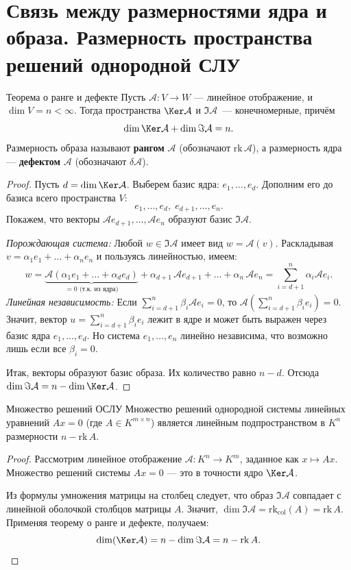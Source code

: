 
\section{Связь между размерностями ядра и образа. Размерность пространства решений однородной СЛУ}

\begin{Proposition}{Теорема о ранге и дефекте}{}
	Пусть $\mathcal{A} \colon V \to W$ --- линейное отображение, и $\dim V = n < \infty$.
	Тогда пространства $\Ker\mathcal{A}$ и $\Im\mathcal{A}$~--- конечномерные, причём
	\[
	\dim\Ker\mathcal{A} + \dim\Im\mathcal{A} = n.
	\]
	Размерность образа называют \textbf{рангом} $\mathcal{A}$ (обозначают $\mathrm{rk}\,\mathcal{A}$), а размерность ядра --- \textbf{дефектом} $\mathcal{A}$ (обозначают $\delta\mathcal{A}$).
\end{Proposition}

\begin{proof}
	Пусть $d = \dim\Ker\mathcal{A}$. Выберем базис ядра: $e_1, \ldots, e_d$.
	Дополним его до базиса всего пространства $V$:
	\[
	e_1, \ldots, e_d,\; e_{d+1}, \ldots, e_n.
	\]
	Покажем, что векторы $\mathcal{A}e_{d+1}, \ldots, \mathcal{A}e_n$ образуют базис $\Im\mathcal{A}$.
	
	\textit{Порождающая система:} Любой $w \in \Im\mathcal{A}$ имеет вид $w = \mathcal{A}(v)$. Раскладывая $v = \alpha_1e_1 + \dots + \alpha_ne_n$ и пользуясь линейностью, имеем:
	\[
	w = \underbrace{\mathcal{A}(\alpha_1 e_1 + \ldots + \alpha_d e_d)}_{=0 \text{ (т.к. из ядра)}} + \alpha_{d+1}\,\mathcal{A}e_{d+1} + \ldots + \alpha_n\,\mathcal{A}e_n = \sum_{i=d+1}^n \alpha_i \mathcal{A}e_i.
	\]
	\textit{Линейная независимость:} Если $\sum_{i=d+1}^n \beta_i \mathcal{A}e_i = 0$, то $\mathcal{A}\left(\sum_{i=d+1}^n \beta_i e_i\right) = 0$. Значит, вектор $u = \sum_{i=d+1}^n \beta_i e_i$ лежит в ядре и может быть выражен через базис ядра $e_1, \dots, e_d$. Но система $e_1, \dots, e_n$ линейно независима, что возможно лишь если все $\beta_i = 0$.
	
	Итак, векторы образуют базис образа. Их количество равно $n-d$. Отсюда $\dim\Im\mathcal{A} = n - \dim\Ker\mathcal{A}$.
\end{proof}

\begin{Theorem}{Множество решений ОСЛУ}{}
	Множество решений однородной системы линейных уравнений $Ax = 0$ (где $A \in K^{m \times n}$) является линейным подпространством в $K^n$ размерности $n - \mathrm{rk}\,A$.
\end{Theorem}

\begin{proof}
	Рассмотрим линейное отображение $\mathcal{A} \colon K^n \to K^m$, заданное как $x \mapsto Ax$. Множество решений системы $Ax = 0$ — это в точности ядро $\Ker\mathcal{A}$.
	
	Из формулы умножения матрицы на столбец следует, что образ $\Im\mathcal{A}$ совпадает с линейной оболочкой столбцов матрицы $A$. Значит, $\dim\Im\mathcal{A} = \mathrm{rk}_{\mathrm{col}}(A) = \mathrm{rk}\,A$.
	Применяя теорему о ранге и дефекте, получаем:
	\[
	\dim(\Ker\mathcal{A}) = n - \dim\Im\mathcal{A} = n - \mathrm{rk}\,A.
	\]
\end{proof}
